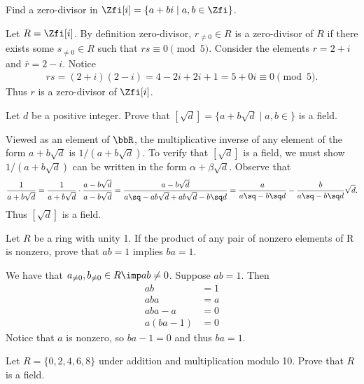 \documentclass{article}
\begin{document}
Find a zero-divisor in \( \Zfi[i] = \{a+bi\mid a,b\in\Zfi\} \).

\begin{solution} %
  Let \( R = \Zfi[i] \). By definition zero-divisor, \( r_{\neq 0}\in R \) is a zero-divisor of \( R \) if there exists some \( s_{\neq 0}\in R \) such that \( rs \equiv 0 \pmod 5 \). Consider the elements \( r = 2+i \) and \( \bar{r} = 2-i \). Notice \begin{align*}
    rs = (2+i)(2-i) = 4 -2i + 2i + 1 = 5 + 0i \equiv 0 \pmod 5.
  \end{align*}
  Thus \( r \) is a zero-divisor of \( \Zfi[i] \).
\end{solution}

Let \( d \) be a positive integer. Prove that \( \![\sqrt d] = \{a + b\sqrt d\mid a,b\in\!\}\) is a field.

\begin{solution} %
  Viewed as an element of \( \bbR \), the multiplicative inverse of any element of the form \( a+b\sqrt d \) is \( 1/(a+b\sqrt d) \). To verify that \( \![\sqrt d] \) is a field, we must show \( 1/(a+b\sqrt d) \) can be written in the form \( \alpha+\beta\sqrt d \). Observe that
  \begin{align*}
    \frac{1}{a+b\sqrt d} = \frac{1}{a+b\sqrt d} \cdot \frac{a-b\sqrt d}{a-b\sqrt d} = \frac{a-b\sqrt{d}}{a\sq -ab\sqrt{d} + ab \sqrt{d} - b\sq d} = \frac{a}{a\sq-b\sq d} - \frac{b}{a\sq-b\sq d}\sqrt{d}.
  \end{align*}
  Thus \( \![\sqrt{d}] \) is a field.
\end{solution}

Let \( R \) be a ring with unity 1. If the product of any pair of nonzero elements of R is nonzero, prove that \( ab=1 \) implies \( ba=1 \).

\begin{solution} %
  We have that \( a_{\neq 0}, b_{\neq 0}\in R \imp ab \neq 0 \). Suppose \( ab = 1 \). Then \begin{align*}
    ab &= 1 \\
    aba &= a \\
    aba - a &= 0 \\
    a(ba - 1) &= 0
  \end{align*}
    Notice that \( a \) is nonzero, so \( ba - 1 = 0 \) and thus \( ba = 1 \).
\end{solution}

Let \( R = \{0, 2, 4, 6, 8\} \) under addition and multiplication modulo 10. Prove that \( R \) is a field.
\end{document}
